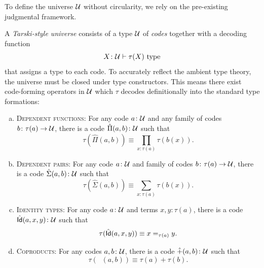 To define the universe $\mathcal U$ without circularity, we rely on the pre-existing judgmental framework.

\begin{defn}
    A \textsl{Tarski-style universe} consists of a type $\mathcal U$ of \textsl{codes} together with a decoding function
    \[
        X\colon\univ\vdash\tau(X)\text{ type}
    \]
    that assigns a type to each code. To accurately reflect the ambient type theory, the universe must be closed under type constructors. This means there exist code-forming operators in $\mathcal U$ which $\tau$ decodes definitionally into the standard type formations:
    \begin{enumerate}[a),font=\upshape]
        \item \textsc{Dependent functions:} For any code $a\colon\univ$ and any family of codes $b\colon\tau(a)\to\univ$, there is a code $\hat{\Pi}(a,b)\colon\univ$ such that
        \[
            \tau(\hat{\Pi}(a,b))\equiv\prod_{x\colon\tau(a)}\tau(b(x)).
        \]
        \item \textsc{Dependent pairs:} For any code $a\colon\univ$ and family of codes $b\colon\tau(a)\to\univ$, there is a code $\hat{\Sigma}(a,b)\colon\univ$ such that
        \[
            \tau(\hat{\Sigma}(a,b))\equiv\sum_{x\colon\tau(a)}\tau(b(x)).
        \]
        \item \textsc{Identity types:} For any code $a\colon\univ$ and terms\/ $x,y\colon\tau(a)$, there is a code $\hat\Id(a,x,y)\colon\univ$ such that
        \[
            \tau(\hat{\mathsf{Id}}(a,x,y))\equiv x\mathrel{=_{\tau(a)}}y.
        \]
        \item \textsc{Coproducts:} For any codes $a,b\colon\univ$, there is a code $\mathop{\hat{+}}(a,b)\colon\univ$ such that
        \[
            \tau(\mathop{\hat{+}}(a,b))\equiv\tau(a)+\tau(b).
        \]
    \end{enumerate}
\end{defn}

